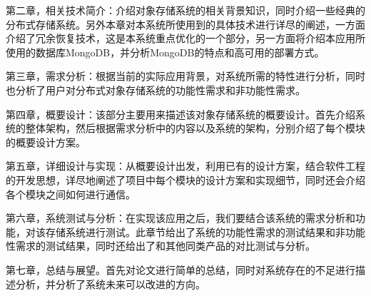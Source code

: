 第二章，相关技术简介：介绍对象存储系统的相关背景知识，同时介绍一些经典的分布式存储系统。另外本章对本系统所使用到的具体技术进行详尽的阐述，一方面介绍了冗余恢复技术，这是本系统重点优化的一个部分，另一方面将介绍本应用所使用的数据库MongoDB，并分析MongoDB的特点和高可用的部署方式。 

第三章，需求分析：根据当前的实际应用背景，对系统所需的特性进行分析，同时也分析了用户对分布式对象存储系统的功能性需求和非功能性需求。

第四章，概要设计：该部分主要用来描述该对象存储系统的概要设计。首先介绍系统的整体架构，然后根据需求分析中的内容以及系统的架构，分别介绍了每个模块的概要设计方案。

第五章，详细设计与实现：从概要设计出发，利用已有的设计方案，结合软件工程的开发思想，详尽地阐述了项目中每个模块的设计方案和实现细节，同时还会介绍各个模块之间如何进行通信。

第六章，系统测试与分析：在实现该应用之后，我们要结合该系统的需求分析和功能，对该存储系统进行测试。此章节给出了系统的功能性需求的测试结果和非功能性需求的测试结果，同时还给出了和其他同类产品的对比测试与分析。

第七章，总结与展望。首先对论文进行简单的总结，同时对系统存在的不足进行描述分析，并分析了系统未来可以改进的方向。
